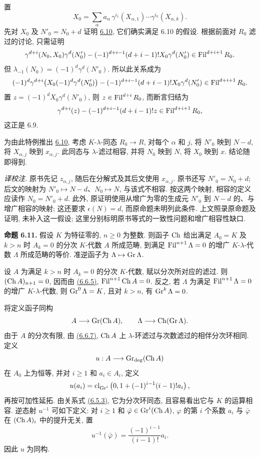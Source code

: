 置
\[
  X_0=\sum_\alpha a_\alpha\,
       \gamma^{i_1}(X_{\alpha,1})\cdots
       \gamma^{i_k}(X_{\alpha,k}).
\]
先对 \(X_0\) 及 \(N'_0=N_0+d\) 证明 \hyperlink{sga6.e05.prop.6-10}{6.10}, 它们确实满足 6.10 的假设. 根据前面对 \(R_0\) 滤过的讨论, 只需证明
\[
  \gamma^{d+i}(N_0,X_0)\gamma^d(N'_0)
  -
  (-1)^{d+i-1}(d+i-1)!X_0\gamma^d(N'_0)
  \in\operatorname{Fil}^{d+i+1}R_0 .
\]
但 \(\lambda_{-1}(N_0)=(-1)^d\gamma^d(N'_0)\). 所以此关系成为
\[
  (-1)^d\gamma^{d+i}\bigl(X_0(-1)^d\gamma^d(N'_0)\bigr)
  -
  (-1)^{d+i-1}(d+i-1)!X_0\gamma^d(N'_0)
  \in\operatorname{Fil}^{d+i+1}R_0 .
\]
置 \(z=(-1)^dX_0\gamma^d(N'_0)\), 则 \(z\in\operatorname{Fil}^{d+i}R_0\), 而断言归结为
\[
  \gamma^{d+i}(z)-(-1)^{d+i-1}(d+i-1)!z\in\operatorname{Fil}^{d+i+1}R_0,
\]
这正是 6.9.

为由此特例推出 \hyperlink{sga6.e05.prop.6-10}{6.10}, 考虑 \(K\)-\(\lambda\)-同态 \(R_0\to R\), 对每个 \(\alpha\) 和 \(j\), 将 \(N'_0\) 映到 \(N-d\), 将 \(X_{\alpha,j}\) 映到 \(x_{\alpha,j}\). 此同态与 \(\lambda\)-滤过相容, 并将 \(N_0\) 映到 \(N\), 将 \(X_0\) 映到 \(x\). 结论随即得到.

\emph{译校注.} 原书先记 \(z_{\alpha,j}\), 随后在分解式及其后文使用 \(x_{\alpha,j}\). 原书还写 \(N'_0=N_0+d\); 后文的映射为 \(N'_0\mapsto N-d\)、\(N_0\mapsto N\), 与该式不相容. 按这两个映射, 相容的定义应读作 \(N_0=N'_0+d\). 此外, 原证明使用从增广为零的生成元 \(N'_0\) 到 \(N-d\) 的、与增广相容的映射; 这还要求 \(\epsilon(N)=d\), 而原命题未明列此条件. 上文照录原命题及证明, 未补入这一假设; 这里分别标明原书等式的一致性问题和增广相容性缺口.

\textbf{命题 6.11.} 假设 \(K\) 为特征零的, \(n\ge0\) 为整数. 则函子 \(\operatorname{Ch}\) 给出满足 \(A_0=K\) 及 \(k>n\) 时 \(A_k=0\) 的分次 \(K\)-代数 \(A\) 所成范畴, 到满足 \(\operatorname{Fil}^{n+1}\Lambda=0\) 的增广 \(K\)-\(\lambda\)-代数 \(\Lambda\) 所成范畴的等价. 准逆函子为 \(\Lambda\mapsto\operatorname{Gr}\Lambda\).

设 \(A\) 为满足 \(k>n\) 时 \(A_k=0\) 的分次 \(K\)-代数, 赋以分次所对应的滤过. 则 \((\operatorname{Ch} A)_{n+1}=0\), 因而由 \hyperlink{sga6.e05.cor.6-6-5}{(6.6.5)}, \(\operatorname{Fil}^{n+1}\operatorname{Ch} A=0\). 反之, 若 \(\Lambda\) 为满足 \(\operatorname{Fil}^{n+1}\Lambda=0\) 的增广 \(K\)-\(\lambda\)-代数, 则 \(\operatorname{Gr}^0\Lambda=K\), 且对 \(k>n\), 有 \(\operatorname{Gr}^k\Lambda=0\).

将定义函子同构
\[
  A\longrightarrow \operatorname{Gr}(\operatorname{Ch} A),
  \qquad
  \Lambda\longrightarrow\operatorname{Ch}(\operatorname{Gr}\Lambda).
\]
由于 \(A\) 的分次有限, 由 \hyperlink{sga6.e05.cor.6-6-7}{(6.6.7)}, \(\operatorname{Ch} A\) 上 \(\lambda\)-环滤过与次数滤过的相伴分次环相同. 定义
\[
  u:A\longrightarrow \operatorname{Gr}_{\deg}(\operatorname{Ch} A)
\]
在 \(A_0\) 上为恒等, 并对 \(i\ge1\) 和 \(a_i\in A_i\), 定义
\[
  u(a_i)=
  \operatorname{cl}_{\operatorname{Gr}^i}\left(0,1+(-1)^{i-1}(i-1)!a_i\right),
\]
再按可加性延拓. 由关系式 \hyperlink{sga6.e05.eq.6-5-3}{(6.5.3)}, 它为分次环同态, 且容易看出它与 \(K\) 的运算相容. 逆态射 \(u^{-1}\) 可如下定义: 对 \(i\ge1\) 和 \(\bar\varphi\in\operatorname{Gr}^i(\operatorname{Ch} A)\), \(\varphi\) 的第 \(i\) 个系数 \(a_i\) 与 \(\bar\varphi\) 在 \((\operatorname{Ch} A)_i\) 中的提升无关, 置
\[
  u^{-1}(\bar\varphi)=\frac{(-1)^{i-1}}{(i-1)!}a_i.
\]
因此 \(u\) 为同构.

